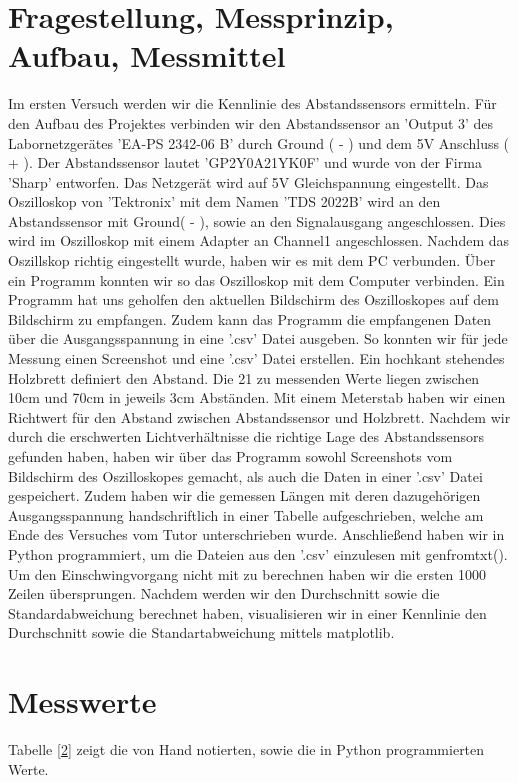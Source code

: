 \documentclass[12pt, oneside, a4paper, \docLanguage]{report}
\begin{document}
\section{Fragestellung, Messprinzip, Aufbau, Messmittel}
\label{chap:VERSUCH_1_FRAGESTELLUNG}
Im ersten Versuch werden wir die Kennlinie des Abstandssensors ermitteln.  Für den Aufbau des Projektes verbinden wir den Abstandssensor an 'Output 3' des Labornetzgerätes 'EA-PS 2342-06 B' durch Ground ( - ) und dem 5V Anschluss ( + ).
Der Abstandssensor lautet 'GP2Y0A21YK0F' und wurde von der Firma 'Sharp' entworfen. Das Netzgerät wird auf 5V Gleichspannung eingestellt. Das Oszilloskop von 'Tektronix' mit dem Namen 'TDS 2022B' wird an den Abstandssensor mit Ground( - ), sowie an den Signalausgang angeschlossen.
Dies wird im Oszilloskop mit einem Adapter an Channel1 angeschlossen. Nachdem das Oszillskop richtig eingestellt wurde, haben wir es mit dem PC verbunden.
Über ein Programm konnten wir so das Oszilloskop mit dem Computer verbinden. Ein Programm hat uns geholfen den aktuellen Bildschirm des Oszilloskopes auf dem Bildschirm zu empfangen.
Zudem kann das Programm die empfangenen Daten über die Ausgangsspannung in eine '.csv' Datei ausgeben.
So konnten wir für jede Messung einen Screenshot und eine '.csv' Datei erstellen. 
Ein hochkant stehendes Holzbrett definiert den Abstand. Die 21 zu messenden Werte liegen zwischen 10cm und 70cm in jeweils  3cm Abständen. Mit einem Meterstab haben wir einen Richtwert für den Abstand zwischen Abstandssensor und Holzbrett. 
Nachdem wir durch die erschwerten Lichtverhältnisse die richtige Lage des Abstandssensors gefunden haben, haben wir über das Programm sowohl Screenshots vom Bildschirm des Oszilloskopes gemacht, als auch die Daten in einer '.csv' Datei gespeichert.
Zudem haben wir die gemessen Längen mit deren dazugehörigen Ausgangsspannung handschriftlich in einer Tabelle aufgeschrieben, welche am Ende des Versuches vom Tutor unterschrieben wurde.
Anschließend haben wir in Python programmiert, um die Dateien aus den '.csv' einzulesen mit genfromtxt(). Um den Einschwingvorgang nicht mit zu berechnen haben wir die ersten 1000 Zeilen übersprungen.
Nachdem werden wir den Durchschnitt sowie die Standardabweichung berechnet haben, visualisieren wir in einer Kennlinie den Durchschnitt sowie die Standartabweichung mittels matplotlib.

\section{Messwerte}
\label{chap:VERSUCH_1_MESSWERTE}
Tabelle [\ref{chap:VERSUCH_1_MESSWERTE}] zeigt die von Hand notierten, sowie die in Python programmierten Werte.
\end{document}
